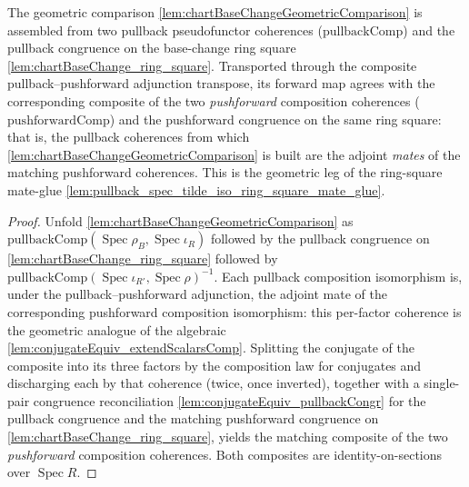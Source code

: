 \begin{lemma}


  \label{lem:chartBaseChangeGeometricComparison_mate}
  The geometric comparison \cref{lem:chartBaseChangeGeometricComparison} is assembled from two
  pullback pseudofunctor coherences (\(\mathrm{pullbackComp}\)) and the pullback congruence on the
  base-change ring square \cref{lem:chartBaseChange_ring_square}. Transported through the composite
  pullback--pushforward adjunction transpose, its forward map agrees with the corresponding composite
  of the two \emph{pushforward} composition coherences (\(\mathrm{pushforwardComp}\)) and the
  pushforward congruence on the same ring square: that is, the pullback coherences from which
  \cref{lem:chartBaseChangeGeometricComparison} is built are the adjoint \emph{mates} of the
  matching pushforward coherences. This is the geometric leg of the ring-square mate-glue
  \cref{lem:pullback_spec_tilde_iso_ring_square_mate_glue}.
  \begin{proof}
    Unfold \cref{lem:chartBaseChangeGeometricComparison} as
    \(\mathrm{pullbackComp}(\operatorname{Spec}\rho_B,\operatorname{Spec}\iota_R)\) followed by the
    pullback congruence on \cref{lem:chartBaseChange_ring_square} followed by
    \(\mathrm{pullbackComp}(\operatorname{Spec}\iota_{R'},\operatorname{Spec}\rho)^{-1}\). Each
    pullback composition isomorphism is, under the pullback--pushforward adjunction, the adjoint
    mate of the corresponding pushforward composition isomorphism: this per-factor coherence is the
    geometric analogue of the algebraic \cref{lem:conjugateEquiv_extendScalarsComp}. Splitting the
    conjugate of the composite into its three factors by the composition law for conjugates and
    discharging each by that coherence (twice, once inverted), together with a single-pair congruence
    reconciliation \cref{lem:conjugateEquiv_pullbackCongr} for the pullback congruence and the matching
    pushforward congruence on \cref{lem:chartBaseChange_ring_square}, yields the matching composite of the two
    \emph{pushforward} composition coherences. Both composites are identity-on-sections over
    \(\operatorname{Spec} R\).
  \end{proof}
\end{lemma}

